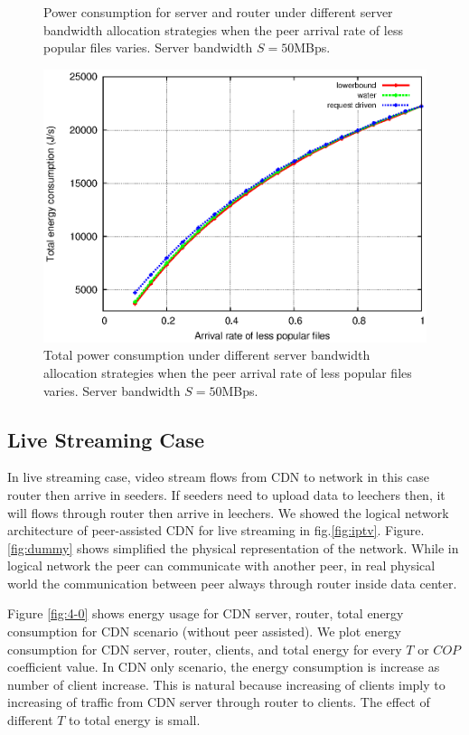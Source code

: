 \documentclass[conference]{IEEEtran}
\begin{document}
\begin{figure}[htp!]
\begin{minipage}[b]{0.3\linewidth}
	\caption{Power consumption for server and router under different server bandwidth allocation strategies when the peer arrival rate of less popular files varies. Server bandwidth $S=50$MBps.}
	\label{fig:componentpop}
\end{minipage}
\hfill
\centering
\begin{minipage}[b]{0.3\linewidth}
	\includegraphics[scale=0.4]{graphs/totalconsumption.eps}
	\caption{Total power consumption under different server bandwidth allocation strategies when the peer arrival rate of less popular files varies. Server bandwidth $S=50$MBps.}
	\label{fig:totalpop}
\end{minipage}
\label{fig:popularity}
\end{figure}



\subsection{Live Streaming Case}
In live streaming case, video stream flows from CDN to network in this case router then arrive in seeders. 
If seeders need to upload data to leechers then, it will flows through router then arrive in leechers. 
We showed the logical network architecture of peer-assisted CDN for live streaming in fig.\ref{fig:iptv}.
Figure.\ref{fig:dummy} shows simplified the physical representation of the network.  
While in logical network the peer can communicate with another peer, in real physical world the communication between peer always through router inside data center.

Figure \ref{fig:4-0} shows energy usage for CDN server, router, total energy consumption for CDN scenario (without peer assisted).
We plot energy consumption for CDN server, router, clients, and total energy for every $T$ or $COP$ coefficient value.
In CDN only scenario, the energy consumption is increase as number of client increase.  
This is natural because increasing of clients imply to increasing of traffic from CDN server through router to clients.
The effect of different $T$ to total energy is small.  
\end{document}
